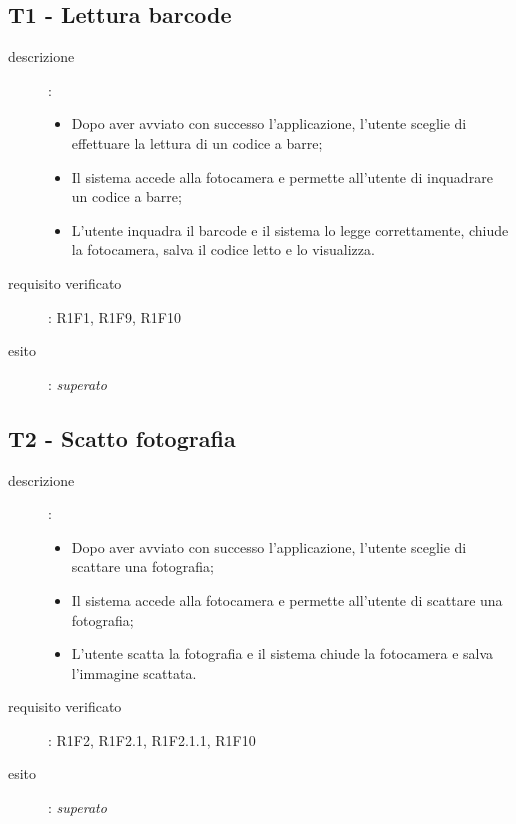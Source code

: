 \subsection{T1 - Lettura barcode}
\begin{description}
\item[descrizione]: \hfill
	\begin{itemize}
	\item Dopo aver avviato con successo l'applicazione, l'utente sceglie di effettuare la lettura di un codice a barre;
	\item Il sistema accede alla fotocamera e permette all'utente di inquadrare un codice a barre;
	\item L'utente inquadra il barcode e il sistema lo legge correttamente, chiude la fotocamera, salva il codice letto e lo visualizza.
	\end{itemize}
\item[requisito verificato]: R1F1, R1F9, R1F10
\item[esito]: \emph{superato}
\end{description}

\subsection{T2 - Scatto fotografia}
\begin{description}
\item[descrizione]: \hfill
	\begin{itemize}
	\item Dopo aver avviato con successo l'applicazione, l'utente sceglie di scattare una fotografia;
	\item Il sistema accede alla fotocamera e permette all'utente di scattare una fotografia;
	\item L'utente scatta la fotografia e il sistema chiude la fotocamera e salva l'immagine scattata.
	\end{itemize}
\item[requisito verificato]: R1F2, R1F2.1, R1F2.1.1, R1F10
\item[esito]: \emph{superato}
\end{description}

